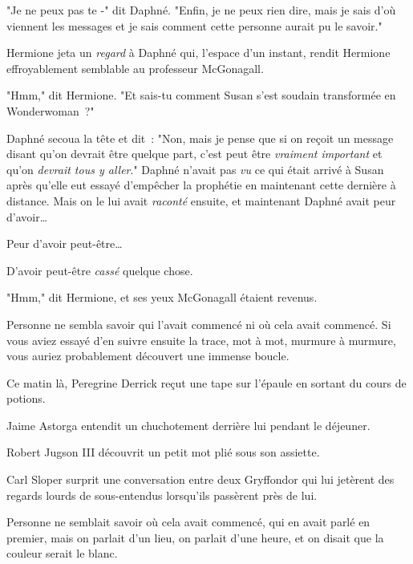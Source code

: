 "Je ne peux pas te -" dit Daphné. "Enfin, je ne peux rien dire, mais je sais d'où viennent les messages et je sais comment cette personne aurait pu le savoir."

Hermione jeta un \emph{regard} à Daphné qui, l'espace d'un instant, rendit Hermione effroyablement semblable au professeur McGonagall.

"Hmm," dit Hermione. "Et sais-tu comment Susan s'est soudain transformée en Wonderwoman~?"

Daphné secoua la tête et dit~: "Non, mais je pense que si on reçoit un message disant qu'on devrait être quelque part, c'est peut être \emph{vraiment important} et qu'on \emph{devrait tous y aller}." Daphné n'avait pas \emph{vu} ce qui était arrivé à Susan après qu'elle eut essayé d'empêcher la prophétie en maintenant cette dernière à distance. Mais on le lui avait \emph{raconté} ensuite, et maintenant Daphné avait peur d'avoir…

Peur d'avoir peut-être…

D'avoir peut-être \emph{cassé} quelque chose.

"Hmm," dit Hermione, et ses yeux McGonagall étaient revenus.

\later

Personne ne sembla savoir qui l'avait commencé ni où cela avait commencé. Si vous aviez essayé d'en suivre ensuite la trace, mot à mot, murmure à murmure, vous auriez probablement découvert une immense boucle.

Ce matin là, Peregrine Derrick reçut une tape sur l'épaule en sortant du cours de potions.

Jaime Astorga entendit un chuchotement derrière lui pendant le déjeuner.

Robert Jugson III découvrit un petit mot plié sous son assiette.

Carl Sloper surprit une conversation entre deux Gryffondor qui lui jetèrent des regards lourds de sous-entendus lorsqu'ils passèrent près de lui.

Personne ne semblait savoir où cela avait commencé, qui en avait parlé en premier, mais on parlait d'un lieu, on parlait d'une heure, et on disait que la couleur serait le blanc.

\later

